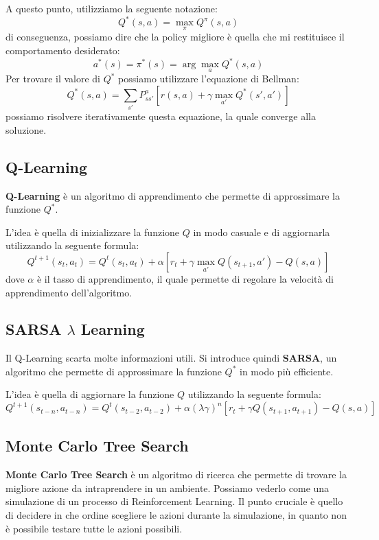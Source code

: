 A questo punto, utilizziamo la seguente notazione:
\begin{equation*}
    Q^{\ast} (s, a) = \max_{\pi} Q^{\pi}(s, a)
\end{equation*}
di conseguenza, possiamo dire che la policy migliore è quella che mi restituisce
il comportamento desiderato:
\begin{equation}
   a^{\ast}(s) = \pi^{\ast} (s) = \arg \max_{a} Q^{\ast} (s, a)
\end{equation}
Per trovare il valore di $Q^{\ast}$ possiamo utilizzare l'equazione di Bellman:
\begin{equation}
    Q^{\ast} (s, a) = \sum_{s'} P_{ss'}^{a} [r(s, a) + \gamma \max_{a'} Q^{\ast} (s', a')]
\end{equation}
possiamo risolvere iterativamente questa equazione, la quale converge alla soluzione.
\subsection{Q-Learning}
\textbf{Q-Learning} è un algoritmo di apprendimento che permette di approssimare
la funzione $Q^{\ast}$. 

L'idea è quella di inizializzare la funzione $Q$ in modo casuale e di aggiornarla
utilizzando la seguente formula:
\begin{equation}
    Q^{t + 1}(s_t, a_t) = Q^{t}(s_t, a_t) + \alpha [r_t + \gamma \max_{a'} 
    Q(s_{t + 1}, a') - Q(s, a)]
\end{equation}
dove $\alpha$ è il tasso di apprendimento, il quale permette di regolare la velocità
di apprendimento dell'algoritmo.
\subsection{SARSA $\lambda$ Learning}
Il Q-Learning scarta molte informazioni utili. Si introduce quindi \textbf{SARSA},
un algoritmo che permette di approssimare la funzione $Q^{\ast}$ in modo più efficiente.

L'idea è quella di aggiornare la funzione $Q$ utilizzando la seguente formula:
\begin{equation}
    Q^{t + 1}(s_{t - n}, a_{t - n}) = Q^{t}(s_{t - 2}, a_{t - 2}) + 
    \alpha(\lambda \gamma)^n  [r_t + \gamma Q(s_{t + 1}, a_{t + 1}) - Q(s, a)]
\end{equation}
\subsection{Monte Carlo Tree Search}
\textbf{Monte Carlo Tree Search} è un algoritmo di ricerca che permette di trovare
la migliore azione da intraprendere in un ambiente. Possiamo vederlo come una 
simulazione di un processo di Reinforcement Learning. Il punto cruciale è quello 
di decidere in che ordine scegliere le azioni durante la simulazione, in quanto 
non è possibile testare tutte le azioni possibili.

